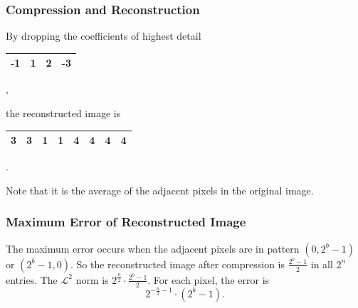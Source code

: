 \subsubsection{Compression and Reconstruction}
By dropping the coefficients of highest detail
\begin{center}
\begin{tabular}{|c|c|c|c|}
\hline	-1	&	1	&	2	&	-3\\	\hline
\end{tabular},
\end{center}
the reconstructed image is
\begin{center}
\begin{tabular}{|c|c|c|c|c|c|c|c|}
\hline	3	&	3	&	1	&	1	&	4	&	4	&	4	&	4\\	\hline
\end{tabular}.
\end{center}
Note that it is the average of the adjacent pixels in the original image.

\subsubsection{Maximum Error of Reconstructed Image}
The maximum error occurs when the adjacent pixels are in pattern \(\left(0,2^{b}-1\right)\) or \(\left(2^{b}-1,0\right)\).
So the reconstructed image after compression is \(\frac{2^b-1}{2}\) in all \(2^n\) entries.
The \(\mathcal{L}^2\) norm is \(2^{\frac{n}{2}}\cdot\frac{2^b-1}{2}\).
For each pixel, the error is \[2^{-\frac{n}{2}-1}\cdot\left(2^b-1\right).\]


